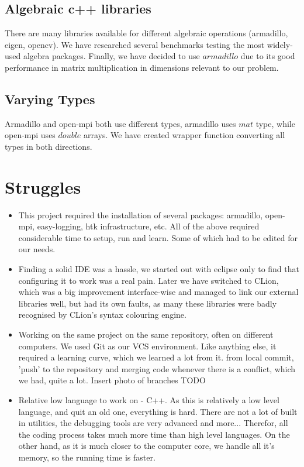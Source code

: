 \documentclass[12pt,a4paper]{article}
\begin{document}
\subsection{Algebraic c++ libraries}
There are many libraries available for different algebraic operations (armadillo, eigen, opencv).
We have researched several benchmarks testing the most widely-used algebra packages. Finally, we have decided to use $armadillo$ due to its good performance in matrix multiplication in dimensions relevant to our problem.

\subsection{Varying Types}
Armadillo and open-mpi both use different types, armadillo uses $mat$ type, while open-mpi uses $double$ arrays. We have created wrapper function converting all types in both directions.

\section{Struggles}
\begin{itemize}
\item This project required the installation of several packages: armadillo, open-mpi, easy-logging, htk infrastructure, etc. All of the above required considerable time to setup, run and learn. Some of which had to be edited for our needs.
\item Finding a solid IDE was a hassle, we started out with eclipse only to find that configuring it to work was a real pain. Later we have switched to CLion, which was a big improvement interface-wise and managed to link our external libraries well, but had its own faults, as many these libraries were badly recognised by CLion's syntax colouring engine.
\item Working on the same project on the same repository, often on different computers. We used Git as our VCS environment. Like anything else, it required a learning curve, which we learned a lot from it. from local commit, 'push' to the repository and merging code whenever there is a conflict, which we had, quite a lot. Insert photo of branches TODO
\item Relative low language to work on - C++. As this is relatively a low level language, and quit an old one, everything is hard. There are not a lot of built in utilities, the debugging tools are very advanced and more... Therefor, all the coding process takes much more time than high level languages. On the other hand, as it is much closer to the computer core, we handle all it's memory, so the running time is faster.
\end{itemize}
\end{document}
